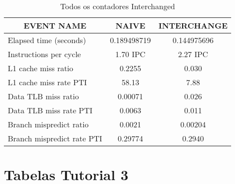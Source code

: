 \documentclass[11pt, oneside]{article}   	%
\begin{document}
\begin{table}[h!]
\centering
\label{my-label}
\begin{tabular}{|l|c|c|}
\hline
\multicolumn{1}{|c|}{\textbf{EVENT NAME}} & \textbf{NAIVE} & \textbf{INTERCHANGE} \\ \hline
Elapsed time (seconds)                    & 0.189498719    & 0.144975696          \\ \hline
Instructions per cycle                    & 1.70 IPC       & 2.27 IPC             \\ \hline
L1 cache miss ratio                       & 0.2255         & 0.030                \\ \hline
L1 cache miss rate PTI                    & 58.13          & 7.88                 \\ \hline
Data TLB miss ratio                       & 0.00071        & 0.026                \\ \hline
Data TLB miss rate PTI                    & 0.0063         & 0.011                \\ \hline
Branch mispredict ratio                   & 0.0021         & 0.00204              \\ \hline
Branch mispredict rate PTI                & 0.29774        & 0.2940               \\ \hline
\end{tabular}
\caption{Todos os contadores Interchanged}
\end{table}

\section{Tabelas Tutorial 3}
\end{document}
